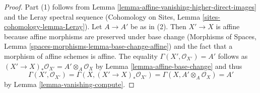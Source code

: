 \documentclass[10pt,a4paper]{amsart}
\theoremstyle{plain}
\theoremstyle{definition}
\theoremstyle{remark}
\numberwithin{equation}{subsection}
\begin{document}
\begin{proof}
Part (1) follows from Lemma \ref{lemma-affine-vanishing-higher-direct-images}
and the Leray spectral sequence (Cohomology on Sites, Lemma
\ref{sites-cohomology-lemma-Leray}). Let $A \to A'$ be as in (2).
Then $X' \to X$ is affine because affine morphisms are preserved under
base change (Morphisms of Spaces, Lemma
\ref{spaces-morphisms-lemma-base-change-affine}) and the
fact that a morphism of affine schemes is affine. The equality
$\Gamma(X', \mathcal{O}_{X'}) = A'$ follows as
$(X' \to X)_*\mathcal{O}_{X'} = A' \otimes_A \mathcal{O}_X$
by Lemma \ref{lemma-affine-base-change} and thus
$$
\Gamma(X', \mathcal{O}_{X'}) =
\Gamma(X, (X' \to X)_*\mathcal{O}_{X'}) =
\Gamma(X, A' \otimes_A \mathcal{O}_X) = A'
$$
by Lemma \ref{lemma-vanishing-compute}.
\end{proof}
\end{document}
